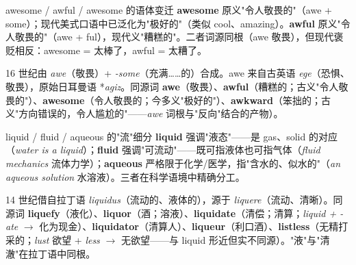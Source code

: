 \documentclass[../main.tex]{subfiles}
\begin{document}



\begin{gram}{awesome / awful / awesome 的语体变迁}
\textbf{awesome} 原义"令人敬畏的"（awe + some）；现代美式口语中已泛化为"极好的"（类似 cool、amazing）。\textbf{awful} 原义"令人敬畏的"（awe + ful），现代义"糟糕的"。二者词源同根（awe 敬畏），但现代褒贬相反：awesome = 太棒了，awful = 太糟了。
\end{gram}

\begin{origin}
16 世纪由 \textit{awe}（敬畏）+ \textit{-some}（充满……的）合成。awe 来自古英语 \textit{ege}（恐惧、敬畏），原始日耳曼语 *\textit{agiz}。同源词 \textbf{awe}（敬畏）、\textbf{awful}（糟糕的；古义"令人敬畏的"）、\textbf{awesome}（令人敬畏的；今多义"极好的"）、\textbf{awkward}（笨拙的；古义"方向错误的，令人尴尬的"——\textit{awe} 词根与"反向"结合的产物）。
\end{origin}




\begin{lex}{liquid / fluid / aqueous 的"流"细分}
\textbf{liquid} 强调"液态"——是 gas、solid 的对应（\textit{water is a liquid}）；\textbf{fluid} 强调"可流动"——既可指液体也可指气体（\textit{fluid mechanics} 流体力学）；\textbf{aqueous} 严格限于化学/医学，指"含水的、似水的"（\textit{an aqueous solution} 水溶液）。三者在科学语境中精确分工。
\end{lex}

\begin{origin}
14 世纪借自拉丁语 \textit{liquidus}（流动的、液体的），源于 \textit{liquere}（流动、清晰）。同源词 \textbf{liquefy}（液化）、\textbf{liquor}（酒；溶液）、\textbf{liquidate}（清偿；清算；\textit{liquid + -ate} $\to$ 化为现金）、\textbf{liquidator}（清算人）、\textbf{liqueur}（利口酒）、\textbf{listless}（无精打采的；\textit{lust} 欲望 + \textit{less} $\to$ 无欲望——与 liquid 形近但实不同源）。"液"与"清澈"在拉丁语中同根。
\end{origin}
\end{document}
